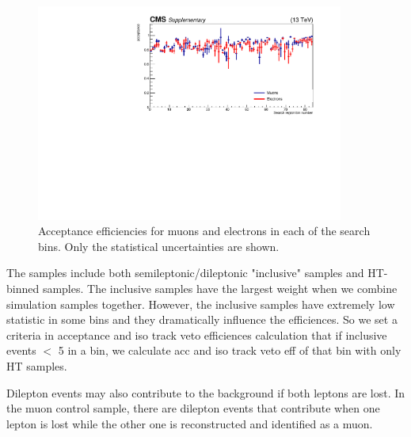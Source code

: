 \begin{figure}[hptb]
\begin{center}
\includegraphics[width=0.9\textwidth]{sections/mc4/Backgrounds/LostLepton/figures/v2_acc_eff_84bins.pdf}%
\end{center}
\caption{Acceptance efficiencies for muons and electrons in each of the
search bins. Only the statistical uncertainties are shown.}
\label{fig:acceptance}
\end{figure}

The \ttbar samples include both semileptonic/dileptonic "inclusive" samples and HT-binned samples.
The \ttbar inclusive samples have the largest weight when we combine simulation samples together.
However, the \ttbar inclusive samples have extremely low statistic in some bins and they dramatically influence the efficiences.
So we set a criteria in acceptance and iso track veto efficiences calculation that if \ttbar inclusive events $<$ 5 in a bin,
we calculate acc and iso track veto eff of that bin with only HT samples.

Dilepton events may also contribute to the background if both leptons are lost.
In the muon control sample, there are dilepton events that contribute 
when one lepton is lost while the other one is reconstructed and
identified as a muon.

